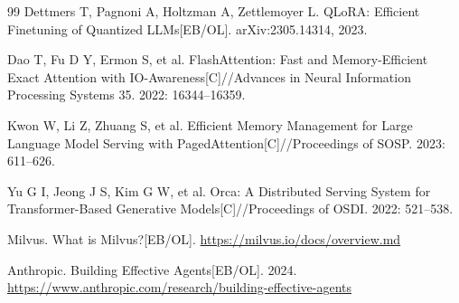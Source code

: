 \begin{thebibliography}{99}
 Dettmers T, Pagnoni A, Holtzman A, Zettlemoyer L. QLoRA: Efficient Finetuning of Quantized LLMs[EB/OL]. arXiv:2305.14314, 2023.

 Dao T, Fu D Y, Ermon S, et al. FlashAttention: Fast and Memory-Efficient Exact Attention with IO-Awareness[C]//Advances in Neural Information Processing Systems 35. 2022: 16344--16359.

 Kwon W, Li Z, Zhuang S, et al. Efficient Memory Management for Large Language Model Serving with PagedAttention[C]//Proceedings of SOSP. 2023: 611--626.

 Yu G I, Jeong J S, Kim G W, et al. Orca: A Distributed Serving System for Transformer-Based Generative Models[C]//Proceedings of OSDI. 2022: 521--538.

 Milvus. What is Milvus?[EB/OL]. \url{https://milvus.io/docs/overview.md}

 Anthropic. Building Effective Agents[EB/OL]. 2024. \url{https://www.anthropic.com/research/building-effective-agents}

\end{thebibliography}
